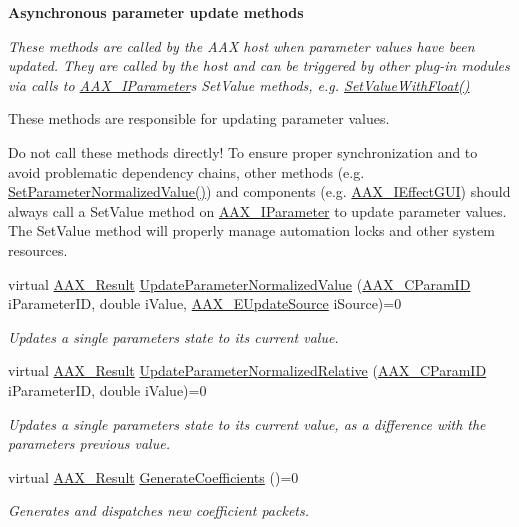 \begin{Indent}\textbf{ Asynchronous parameter update methods}\par
{\em These methods are called by the A\+AX host when parameter values have been updated. They are called by the host and can be triggered by other plug-\/in modules via calls to \mbox{\hyperlink{a01857}{A\+A\+X\+\_\+\+I\+Parameter}}\textquotesingle{}s {\ttfamily Set\+Value} methods, e.\+g. \mbox{\hyperlink{a01857_a1d37b80bc3a9c4e53fc2c1684f47dfb7}{Set\+Value\+With\+Float()}}

These methods are responsible for updating parameter values.

Do not call these methods directly! To ensure proper synchronization and to avoid problematic dependency chains, other methods (e.\+g. \mbox{\hyperlink{a01669_a368b0f5a761d1eda4c41b420f153a077}{Set\+Parameter\+Normalized\+Value()}}) and components (e.\+g. \mbox{\hyperlink{a01821}{A\+A\+X\+\_\+\+I\+Effect\+G\+UI}}) should always call a {\ttfamily Set\+Value} method on \mbox{\hyperlink{a01857}{A\+A\+X\+\_\+\+I\+Parameter}} to update parameter values. The {\ttfamily Set\+Value} method will properly manage automation locks and other system resources. }\begin{DoxyCompactItemize}
\item 
virtual \mbox{\hyperlink{a00392_a4d8f69a697df7f70c3a8e9b8ee130d2f}{A\+A\+X\+\_\+\+Result}} \mbox{\hyperlink{a01669_a685858711efb8634ce66c327f2865c71}{Update\+Parameter\+Normalized\+Value}} (\mbox{\hyperlink{a00392_a1440c756fe5cb158b78193b2fc1780d1}{A\+A\+X\+\_\+\+C\+Param\+ID}} i\+Parameter\+ID, double i\+Value, \mbox{\hyperlink{a00491_a30be0398faf20c6b121239eb9399f3f7}{A\+A\+X\+\_\+\+E\+Update\+Source}} i\+Source)=0
\begin{DoxyCompactList}\small\item\em Updates a single parameter\textquotesingle{}s state to its current value. \end{DoxyCompactList}\item 
virtual \mbox{\hyperlink{a00392_a4d8f69a697df7f70c3a8e9b8ee130d2f}{A\+A\+X\+\_\+\+Result}} \mbox{\hyperlink{a01669_a54403bec090fcc999a93f54c01bca0c9}{Update\+Parameter\+Normalized\+Relative}} (\mbox{\hyperlink{a00392_a1440c756fe5cb158b78193b2fc1780d1}{A\+A\+X\+\_\+\+C\+Param\+ID}} i\+Parameter\+ID, double i\+Value)=0
\begin{DoxyCompactList}\small\item\em Updates a single parameter\textquotesingle{}s state to its current value, as a difference with the parameter\textquotesingle{}s previous value. \end{DoxyCompactList}\item 
virtual \mbox{\hyperlink{a00392_a4d8f69a697df7f70c3a8e9b8ee130d2f}{A\+A\+X\+\_\+\+Result}} \mbox{\hyperlink{a01669_a083265b008921b6114ede387711694b7}{Generate\+Coefficients}} ()=0
\begin{DoxyCompactList}\small\item\em Generates and dispatches new coefficient packets. \end{DoxyCompactList}\end{DoxyCompactItemize}
\end{Indent}
